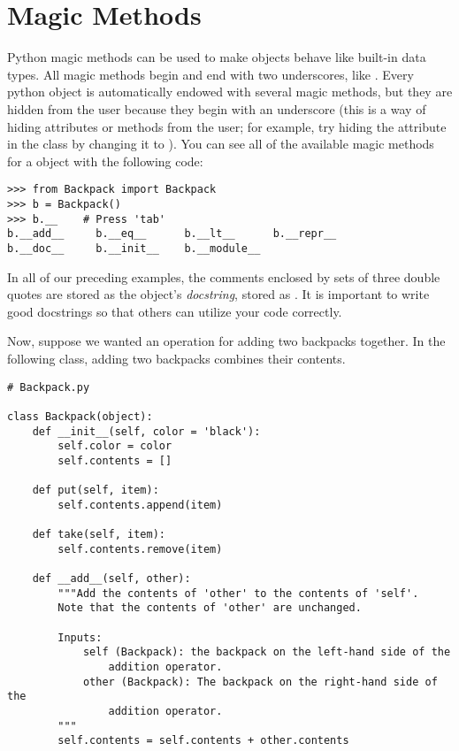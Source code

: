 \section*{Magic Methods}

Python magic methods can be used to make objects behave like built-in data types.
All magic methods begin and end with two underscores, like .
Every python object is automatically endowed with several magic methods, but they are hidden from the user because they begin with an underscore (this is a way of hiding attributes or methods from the user; for example, try hiding the  attribute in the  class by changing it to ).
You can see all of the available magic methods for a  object with the following code:

\begin{lstlisting}
>>> from Backpack import Backpack
>>> b = Backpack()
>>> b.__	# Press 'tab'
b.__add__     b.__eq__      b.__lt__      b.__repr__    
b.__doc__     b.__init__    b.__module__
\end{lstlisting}

In all of our preceding examples, the comments enclosed by sets of three double quotes are stored as the object's \emph{docstring}, stored as .
It is important to write good docstrings so that others can utilize your code correctly.

Now, suppose we wanted an operation for adding two backpacks together.
In the following class, adding two backpacks combines their contents.

\begin{lstlisting}
# Backpack.py

class Backpack(object):
    def __init__(self, color = 'black'):
        self.color = color
        self.contents = []

    def put(self, item):
        self.contents.append(item)

    def take(self, item):
        self.contents.remove(item)

    def __add__(self, other):
        """Add the contents of 'other' to the contents of 'self'.
        Note that the contents of 'other' are unchanged.
        
        Inputs:
            self (Backpack): the backpack on the left-hand side of the
                addition operator.
            other (Backpack): The backpack on the right-hand side of the
                addition operator.
        """
        self.contents = self.contents + other.contents
\end{lstlisting}

